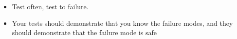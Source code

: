 \begin{itemize}
\item Test often, test to failure.
\item Your tests should demonstrate that you know the failure modes, and they should demonstrate that the failure mode is safe
\end{itemize}
